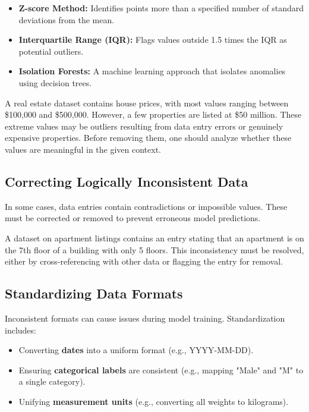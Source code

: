 \documentclass[12pt,openany]{book}
\begin{document}
\begin{itemize}
    \item \textbf{Z-score Method:} Identifies points more than a specified number of standard deviations from the mean.
    \item \textbf{Interquartile Range (IQR):} Flags values outside 1.5 times the IQR as potential outliers.
    \item \textbf{Isolation Forests:} A machine learning approach that isolates anomalies using decision trees.
\end{itemize}

\noindent\begin{minipage}{\textwidth}
\begin{examplebox}
A real estate dataset contains house prices, with most values ranging between \$100,000 and \$500,000. However, a few properties are listed at \$50 million. These extreme values may be outliers resulting from data entry errors or genuinely expensive properties. Before removing them, one should analyze whether these values are meaningful in the given context.
\end{examplebox}
\end{minipage}

\subsection{Correcting Logically Inconsistent Data}
In some cases, data entries contain contradictions or impossible values. These must be corrected or removed to prevent erroneous model predictions.

\begin{examplebox}
A dataset on apartment listings contains an entry stating that an apartment is on the 7th floor of a building with only 5 floors. This inconsistency must be resolved, either by cross-referencing with other data or flagging the entry for removal.
\end{examplebox}

\subsection{Standardizing Data Formats}
Inconsistent formats can cause issues during model training. Standardization includes:

\begin{itemize}
    \item Converting \textbf{dates} into a uniform format (e.g., YYYY-MM-DD).
    \item Ensuring \textbf{categorical labels} are consistent (e.g., mapping "Male" and "M" to a single category).
    \item Unifying \textbf{measurement units} (e.g., converting all weights to kilograms).
\end{itemize}
\end{document}
